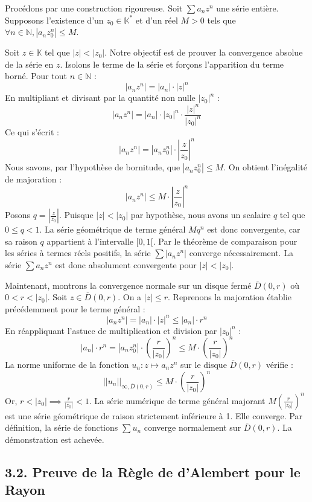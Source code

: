 \documentclass{report}
\begin{document}
Procédons par une construction rigoureuse.
Soit $\sum a_n z^n$ une série entière.
Supposons l'existence d'un $z_0 \in \mathbb{K}^*$ et d'un réel $M > 0$ tels que $\forall n \in \mathbb{N}, |a_n z_0^n| \leq M$.

Soit $z \in \mathbb{K}$ tel que $|z| < |z_0|$. Notre objectif est de prouver la convergence absolue de la série en $z$.
Isolons le terme de la série et forçons l'apparition du terme borné. Pour tout $n \in \mathbb{N}$ :
$$|a_n z^n| = |a_n| \cdot |z|^n$$
En multipliant et divisant par la quantité non nulle $|z_0|^n$ :
$$|a_n z^n| = |a_n| \cdot |z_0|^n \cdot \frac{|z|^n}{|z_0|^n}$$
Ce qui s'écrit :
$$|a_n z^n| = |a_n z_0^n| \cdot \left| \frac{z}{z_0} \right|^n$$
Nous savons, par l'hypothèse de bornitude, que $|a_n z_0^n| \leq M$. On obtient l'inégalité de majoration :
$$|a_n z^n| \leq M \cdot \left| \frac{z}{z_0} \right|^n$$
Posons $q = \left| \frac{z}{z_0} \right|$. Puisque $|z| < |z_0|$ par hypothèse, nous avons un scalaire $q$ tel que $0 \leq q < 1$.
La série géométrique de terme général $M q^n$ est donc convergente, car sa raison $q$ appartient à l'intervalle $[0, 1[$.
Par le théorème de comparaison pour les séries à termes réels positifs, la série $\sum |a_n z^n|$ converge nécessairement.
La série $\sum a_n z^n$ est donc absolument convergente pour $|z| < |z_0|$.

Maintenant, montrons la convergence normale sur un disque fermé $\overline{D}(0, r)$ où $0 < r < |z_0|$.
Soit $z \in \overline{D}(0, r)$. On a $|z| \leq r$.
Reprenons la majoration établie précédemment pour le terme général :
$$|a_n z^n| = |a_n| \cdot |z|^n \leq |a_n| \cdot r^n$$
En réappliquant l'astuce de multiplication et division par $|z_0|^n$ :
$$|a_n| \cdot r^n = |a_n z_0^n| \cdot \left( \frac{r}{|z_0|} \right)^n \leq M \cdot \left( \frac{r}{|z_0|} \right)^n$$
La norme uniforme de la fonction $u_n : z \mapsto a_n z^n$ sur le disque $\overline{D}(0, r)$ vérifie :
$$||u_n||_{\infty, \overline{D}(0, r)} \leq M \cdot \left( \frac{r}{|z_0|} \right)^n$$
Or, $r < |z_0| \implies \frac{r}{|z_0|} < 1$.
La série numérique de terme général majorant $M \left( \frac{r}{|z_0|} \right)^n$ est une série géométrique de raison strictement inférieure à 1. Elle converge.
Par définition, la série de fonctions $\sum u_n$ converge normalement sur $\overline{D}(0, r)$. La démonstration est achevée.

\subsection*{3.2. Preuve de la Règle de d'Alembert pour le Rayon}
\end{document}
